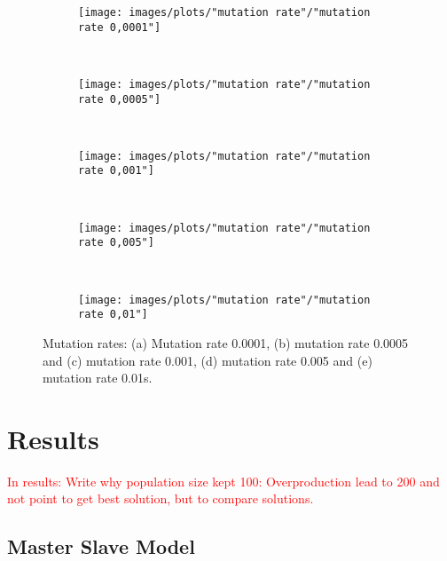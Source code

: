 \begin{figure}[h!]
    \centering
      \begin{subfigure}[b]{0.31\textwidth}
        \texttt{[image: images/plots/"mutation rate"/"mutation rate 0,0001"]}
        \caption{}
        \hfill
        \label{plot:single point crossover}
    \end{subfigure}
    ~
      \begin{subfigure}[b]{0.31\textwidth}
        \texttt{[image: images/plots/"mutation rate"/"mutation rate 0,0005"]}
        \caption{}
        \hfill
        \label{plot:single point crossover}
    \end{subfigure}
    ~
    \begin{subfigure}[b]{0.31\textwidth}
        \texttt{[image: images/plots/"mutation rate"/"mutation rate 0,001"]}
        \caption{}
        \hfill
        \label{plot:single point crossover}
    \end{subfigure}
    ~
    \begin{subfigure}[b]{0.31\textwidth}
        \texttt{[image: images/plots/"mutation rate"/"mutation rate 0,005"]}
        \caption{}
        \hfill
        \label{plot:two point crossover}
    \end{subfigure}
    ~
    \begin{subfigure}[b]{0.31\textwidth}
        \texttt{[image: images/plots/"mutation rate"/"mutation rate 0,01"]}
        \caption{}
        \hfill
        \label{plot:uniform crossover}
    \end{subfigure}
    \caption{Mutation rates: (a) Mutation rate 0.0001, (b) mutation rate 0.0005 and (c) mutation rate 0.001, (d) mutation rate 0.005 and (e) mutation rate 0.01s.}
    \label{plot:crossover methods}
\end{figure}


\section{Results}\label{section:results}
\textcolor{red}{In results: Write why population size kept 100: Overproduction lead to 200 and not point to get best solution, but to compare solutions.}


\subsection{Master Slave Model}


